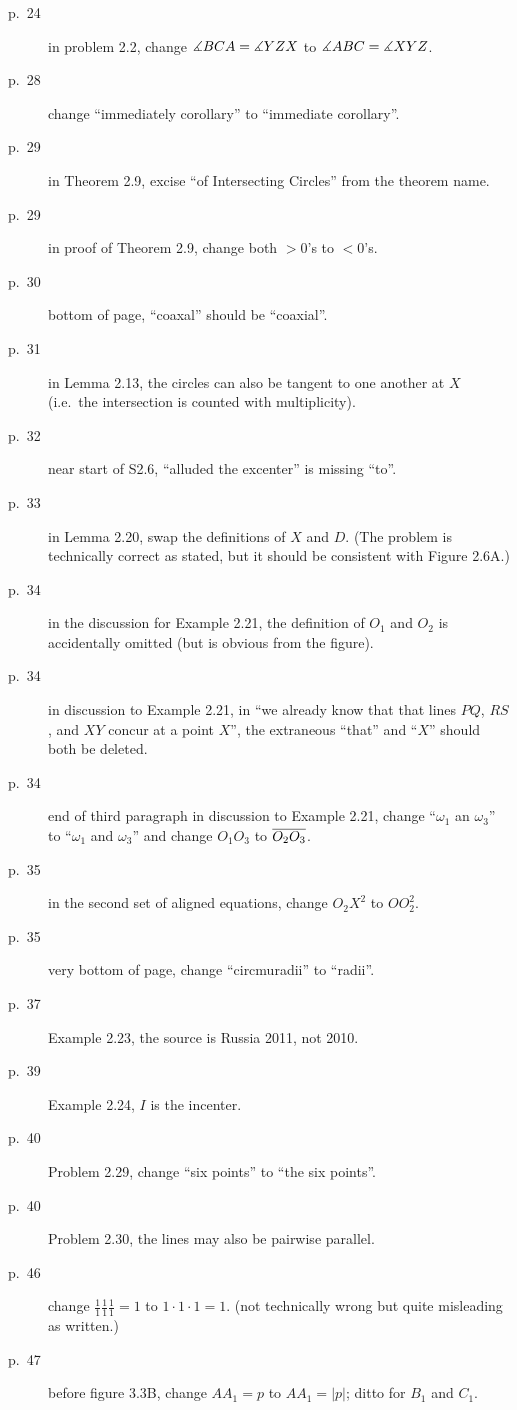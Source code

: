 \documentclass[11pt]{scrartcl}
\begin{document}
\begin{description}
\item[p.\  24] in problem 2.2, change $\measuredangle BCA = \measuredangle YZX$
  to $\measuredangle ABC = \measuredangle XYZ$.
\item[p.\  28] change ``immediately corollary'' to ``immediate corollary''.
\item[p.\  29] in Theorem 2.9, excise ``of Intersecting Circles'' from the theorem name.
\item[p.\  29] in proof of Theorem 2.9, change both $>0$'s to $<0$'s.
\item[p.\  30] bottom of page, ``coaxal'' should be ``coaxial''.
\item[p.\  31] in Lemma 2.13, the circles can also be tangent
  to one another at $X$ (i.e.\ the intersection is counted with multiplicity).
\item[p.\  32] near start of S2.6, ``alluded the excenter'' is missing ``to''.
\item[p.\  33] in Lemma 2.20, swap the definitions of $X$ and $D$.
  (The problem is technically correct as stated,
  but it should be consistent with Figure 2.6A.)
\item[p.\  34] in the discussion for Example 2.21,
  the definition of $O_1$ and $O_2$ is accidentally omitted (but is obvious from the figure).
\item[p.\  34] in discussion to Example 2.21, in
  ``we already know that that lines $PQ$, $RS$, and $XY$ concur at a point $X$'',
  the extraneous ``that'' and ``$X$'' should both be deleted.
\item[p.\  34] end of third paragraph in discussion to Example 2.21,
  change ``$\omega_1$ an $\omega_3$'' to ``$\omega_1$ and $\omega_3$''
  and change $O_1O_3$ to $\overline{O_2O_3}$.
\item[p.\  35] in the second set of aligned equations,
  change $O_2X^2$ to $OO_2^2$.
\item[p.\  35] very bottom of page, change ``circmuradii'' to ``radii''.
\item[p.\  37] Example 2.23, the source is Russia 2011, not 2010.
\item[p.\  39] Example 2.24, $I$ is the incenter.
\item[p.\  40] Problem 2.29, change ``six points'' to ``the six points''.
\item[p.\  40] Problem 2.30, the lines may also be pairwise parallel.
\item[p.\  46] change $\frac 11 \frac 11 \frac 11 = 1$ to $1 \cdot 1 \cdot 1 = 1$.
  (not technically wrong but quite misleading as written.)
\item[p.\  47] before figure 3.3B, change $AA_1=p$ to $AA_1=|p|$; ditto for $B_1$ and $C_1$.

\end{description}
\end{document}
